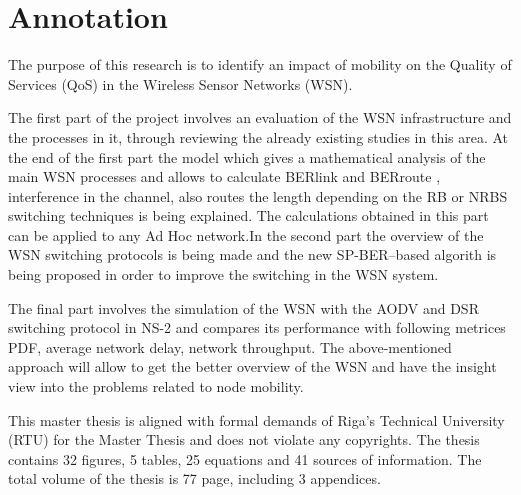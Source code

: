\chapter{Annotation}
The purpose of this research is to identify an impact of mobility on the Quality of Services (QoS) in the Wireless Sensor Networks (WSN).

The first part of the project involves an evaluation of the WSN infrastructure and the processes in it, through reviewing the already existing studies in this area.  At the end of the first part the model which gives a mathematical analysis of the main WSN processes and allows to calculate BERlink and BERroute , interference in the channel, also routes the length depending on the RB or NRBS switching techniques is being explained. The calculations obtained in this part can be applied to any Ad Hoc network.In the second part the overview of the WSN switching protocols is being made and the new SP-BER–based algorith is being proposed in order to improve the switching in the WSN system.

The final part involves the simulation of the WSN with the AODV and DSR switching protocol in NS-2 and compares its performance with following metrices PDF, average network delay, network throughput. The above-mentioned approach will allow to get the better overview of the WSN and have the insight view into the problems related to node mobility.

This master thesis is aligned with formal demands of Riga’s Technical University (RTU) for the Master Thesis and does not violate any copyrights. The thesis contains 32 figures, 5 tables, 25 equations and 41 sources of information. The total volume of the thesis is 77 page, including 3 appendices.